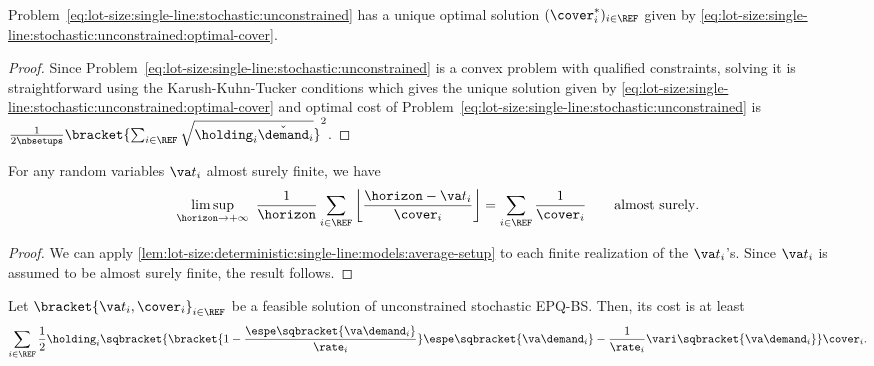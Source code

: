 \begin{lem}\label{lem:lot-size:single-line:stochastic:unconstrained:optimality}
Problem~\eqref{eq:lot-size:single-line:stochastic:unconstrained} has a unique optimal solution $(\cover_i^*)_{i\in\REF}$ given by \cref{eq:lot-size:single-line:stochastic:unconstrained:optimal-cover}.
\end{lem}


\begin{proof}
Since Problem~\eqref{eq:lot-size:single-line:stochastic:unconstrained} is a convex problem with qualified constraints, solving it is straightforward using the Karush-Kuhn-Tucker conditions which gives the unique solution given by \cref{eq:lot-size:single-line:stochastic:unconstrained:optimal-cover} and optimal cost of Problem~\eqref{eq:lot-size:single-line:stochastic:unconstrained} is $\frac{1}{2\nbsetups}\bracket{\sum_{i\in\REF}\sqrt{\holding_i\check{\demand}_i}}^2$.
\end{proof}


\begin{lem}\label{lem:lot-size:stochastic:single-line:models:average-setup}
For any random variables $\va t_i$ almost surely finite, we have
\begin{equation}
\limsup_{\horizon\rightarrow+\infty}\ \frac{1}{\horizon} \sum_{i\in\REF} \left\lfloor\frac{\horizon-\va t_i}{\cover_i}\right\rfloor
=
\sum_{i\in\REF} \frac{1}{\cover_i}\qquad \mbox{almost surely}.
\end{equation}
\end{lem}


\begin{proof}
We can apply \cref{lem:lot-size:deterministic:single-line:models:average-setup} to each finite realization of the $\va t_i$'s.
Since $\va t_i$ is assumed to be almost surely finite, the result follows.
\end{proof}



\begin{lem}\label{lem:lot-size:stochastic:single-line:models:ZIO}
Let $\bracket{\va t_i,\cover_i}_{i\in\REF}$ be a feasible solution of unconstrained stochastic EPQ-BS.
Then, its cost is at least
\begin{equation}
  \sum_{i\in\REF}\frac{1}{2}\holding_i\sqbracket{\bracket{1-\frac{\espe\sqbracket{\va\demand_i}}{\rate_i}}\espe\sqbracket{\va\demand_i} - \frac{1}{\rate_i}\vari\sqbracket{\va\demand_i}}\cover_i.
\end{equation}
\end{lem}


